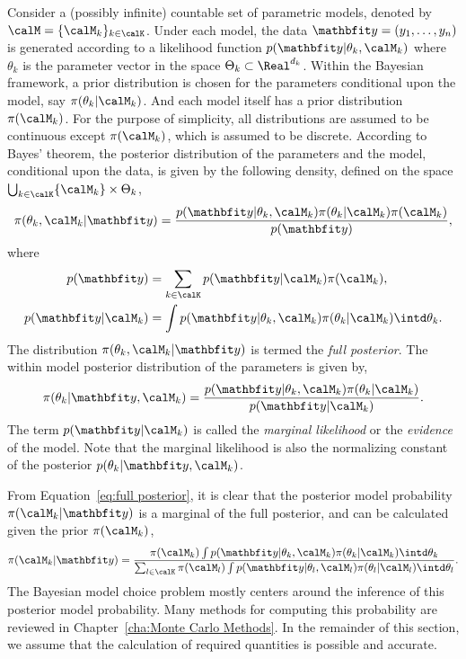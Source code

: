 Consider a (possibly infinite) countable set of parametric models, denoted by $\calM = \{\calM_k\}_{k\in\calK}$. Under each model, the data $\data = (y_1,\dots,y_n)$ is generated according to a likelihood function $p(\data|\theta_k,\calM_k)$ where $\theta_k$ is the parameter vector in the space $\Theta_k\subset\Real^{d_k}$. Within the Bayesian framework, a prior distribution is chosen for the parameters conditional upon the model, say $\pi(\theta_k|\calM_k)$. And each model itself has a prior distribution $\pi(\calM_k)$. For the purpose of simplicity, all distributions are assumed to be continuous except $\pi(\calM_k)$, which is assumed to be discrete. According to Bayes' theorem, the posterior distribution of the parameters and the model, conditional upon the data, is given by the following density, defined on the space $\bigcup_{k\in\calK}\{\calM_k\}\times\Theta_k$,
\begin{equation}
  \pi(\theta_k,\calM_k|\data) =
  \frac{p(\data|\theta_k,\calM_k)\pi(\theta_k|\calM_k)\pi(\calM_k)}{p(\data)},
  \label{eq:full posterior}
\end{equation}
where
\begin{align}
  p(\data) &= \sum_{k\in\calK}p(\data|\calM_k)\pi(\calM_k), \\
  p(\data|\calM_k) &=
  \int p(\data|\theta_k,\calM_k)\pi(\theta_k|\calM_k)\intd\theta_k.
  \label{eq:marginal likelihood}
\end{align}
The distribution $\pi(\theta_k,\calM_k|\data)$ is termed the \emph{full posterior}. The within model posterior distribution of the parameters is given by,
\begin{equation}
  \pi(\theta_k|\data,\calM_k) =
  \frac{p(\data|\theta_k,\calM_k)\pi(\theta_k|\calM_k)}{p(\data|\calM_k)}.
  \label{eq:within posterior}
\end{equation}
The term $p(\data|\calM_k)$ is called the \emph{marginal likelihood} or the \emph{evidence} of the model. Note that the marginal likelihood is also the normalizing constant of the posterior $p(\theta_k|\data,\calM_k)$.

From Equation~\eqref{eq:full posterior}, it is clear that the posterior model probability $\pi(\calM_k|\data)$ is a marginal of the full posterior, and can be calculated given the prior $\pi(\calM_k)$,
\begin{equation}
  \pi(\calM_k|\data) = \frac{
    \pi(\calM_k)
    \int p(\data|\theta_k,\calM_k)\pi(\theta_k|\calM_k)\intd\theta_k
  }{
    \sum_{l\in\calK}\pi(\calM_l)
    \int p(\data|\theta_l,\calM_l)\pi(\theta_l|\calM_l)\intd\theta_l
  }.
  \label{eq:post model prob}
\end{equation}
The Bayesian model choice problem mostly centers around the inference of this posterior model probability. Many methods for computing this probability are reviewed in Chapter~\ref{cha:Monte Carlo Methods}. In the remainder of this section, we assume that the calculation of required quantities is possible and accurate.

